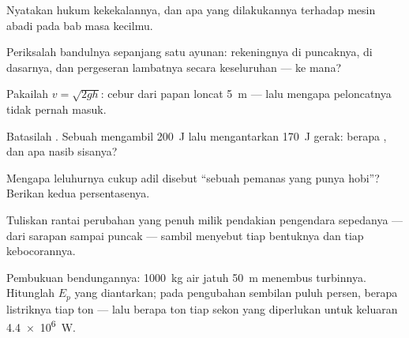 \begin{exercise}[$\star$]\label{exo:g9:energy-conversions:3}
Nyatakan hukum kekekalannya, dan apa yang dilakukannya terhadap mesin
abadi pada bab masa kecilmu.
\end{exercise}

\begin{exercise}[$\star$]\label{exo:g9:energy-conversions:4}
Periksalah bandulnya sepanjang satu ayunan: rekeningnya di puncaknya,
di dasarnya, dan pergeseran lambatnya secara keseluruhan --- ke mana?
\end{exercise}

\begin{exercise}[$\star$]\label{exo:g9:energy-conversions:5}
Pakailah $v = \sqrt{2 g h}$:  cebur dari papan loncat
\qty{5}{m} --- lalu mengapa  peloncatnya tidak pernah masuk.
\end{exercise}

\begin{exercise}[$\star$]\label{exo:g9:energy-conversions:6}
Batasilah . Sebuah  mengambil \qty{200}{J} lalu
mengantarkan \qty{170}{J} gerak: berapa , dan apa nasib
sisanya?
\end{exercise}

\begin{exercise}[$\star$]\label{exo:g9:energy-conversions:7}
Mengapa  leluhurnya cukup adil disebut ``sebuah pemanas yang
punya hobi''? Berikan kedua persentasenya.
\end{exercise}

\begin{exercise}[$\star$]\label{exo:g9:energy-conversions:8}
Tuliskan rantai perubahan yang penuh milik pendakian pengendara
sepedanya --- dari sarapan sampai puncak --- sambil menyebut tiap
bentuknya dan tiap kebocorannya.
\end{exercise}

\begin{exercise}[$\star\star$]\label{exo:g9:energy-conversions:9}
Pembukuan bendungannya: \qty{1000}{kg} air jatuh \qty{50}{m}
menembus turbinnya. Hitunglah $E_p$ yang diantarkan; pada pengubahan
sembilan puluh persen, berapa  listriknya tiap ton --- lalu
berapa ton tiap sekon yang diperlukan untuk keluaran
\qty{4.4e6}{W}.
\end{exercise}

